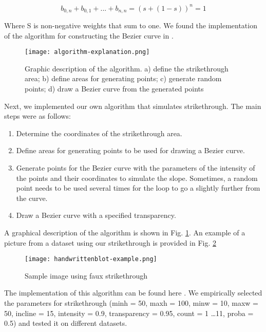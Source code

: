 \documentclass[10pt,twocolumn,letterpaper]{article}
\begin{document}
\begin{equation}\label{eq6}
b_{0,n}+b_{0,1}+...+b_{n,n}=(s+(1-s))^n=1
\end{equation}

Where S is non-negative weights that sum to one. We found the implementation of the algorithm for constructing the Bezier curve in \cite{Hermes2017}.

\begin{figure}[ht]
\begin{center}
   \texttt{[image: algorithm-explanation.png]}
\end{center}
   \caption{Graphic description of the algorithm. a) define the strikethrough area; b) define areas for generating points;  c) generate random points; d) draw a Bezier curve from the generated points}
\label{fig:hwb-algorithm-explanation}
\end{figure}

Next, we implemented our own algorithm that simulates strikethrough. The main steps were as follows:
\begin{enumerate}
    \item Determine the coordinates of the strikethrough area.
    \item Define areas for generating points to be used for drawing a Bezier curve.
    \item Generate points for the Bezier curve with the parameters of the intensity of the points and their coordinates to simulate the slope. Sometimes, a random point needs to be used several times for the loop to go a slightly further from the curve.
    \item Draw a Bezier curve with a specified transparency.
\end{enumerate}

A graphical description of the algorithm is shown in Fig. \ref{fig:hwb-algorithm-explanation}. An example of a picture from a dataset using our strikethrough is provided in Fig. \ref{fig:hwb-hwb-example}

\begin{figure}[t]
\begin{center}
   \texttt{[image: handwrittenblot-example.png]}
\end{center}
   \caption{Sample image using faux strikethrough}
\label{fig:hwb-hwb-example}
\end{figure}

The implementation of this algorithm can be found here \cite{codelink}. We empirically selected the parameters for strikethrough (minh = 50, maxh = 100, minw = 10, maxw = 50, incline = 15, intensity = 0.9, transparency = 0.95, count = 1 \ldots 11, proba = 0.5) and tested it on different datasets.
\end{document}
